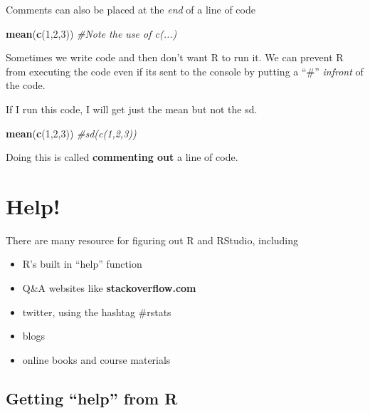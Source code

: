 \documentclass[]{book}
\newenvironment{Shaded}{\begin{snugshade}}{\end{snugshade}}
\newcommand{\KeywordTok}[1]{\textcolor[rgb]{0.13,0.29,0.53}{\textbf{#1}}}
\newcommand{\DecValTok}[1]{\textcolor[rgb]{0.00,0.00,0.81}{#1}}
\newcommand{\CommentTok}[1]{\textcolor[rgb]{0.56,0.35,0.01}{\textit{#1}}}
\newcommand{\NormalTok}[1]{#1}
\providecommand{\tightlist}{%
  \setlength{\itemsep}{0pt}\setlength{\parskip}{0pt}}
\theoremstyle{definition}
\theoremstyle{definition}
\theoremstyle{definition}
\theoremstyle{remark}
\begin{document}
Comments can also be placed at the \emph{end} of a line of code

\begin{Shaded}
\begin{Highlighting}[]
\KeywordTok{mean}\NormalTok{(}\KeywordTok{c}\NormalTok{(}\DecValTok{1}\NormalTok{,}\DecValTok{2}\NormalTok{,}\DecValTok{3}\NormalTok{)) }\CommentTok{#Note  the use of c(...)}
\end{Highlighting}
\end{Shaded}

Sometimes we write code and then don't want R to run it. We can prevent
R from executing the code even if its sent to the console by putting a
``\#'' \emph{infront} of the code.

If I run this code, I will get just the mean but not the sd.

\begin{Shaded}
\begin{Highlighting}[]
\KeywordTok{mean}\NormalTok{(}\KeywordTok{c}\NormalTok{(}\DecValTok{1}\NormalTok{,}\DecValTok{2}\NormalTok{,}\DecValTok{3}\NormalTok{))}
\CommentTok{#sd(c(1,2,3))}
\end{Highlighting}
\end{Shaded}

Doing this is called \textbf{commenting out} a line of code.

\section{Help!}\label{help}

There are many resource for figuring out R and RStudio, including

\begin{itemize}
\tightlist
\item
  R's built in ``help'' function
\item
  Q\&A websites like \textbf{stackoverflow.com}
\item
  twitter, using the hashtag \#rstats
\item
  blogs
\item
  online books and course materials
\end{itemize}

\subsection{\texorpdfstring{Getting ``help'' from
R}{Getting help from R}}\label{getting-help-from-r}
\end{document}
